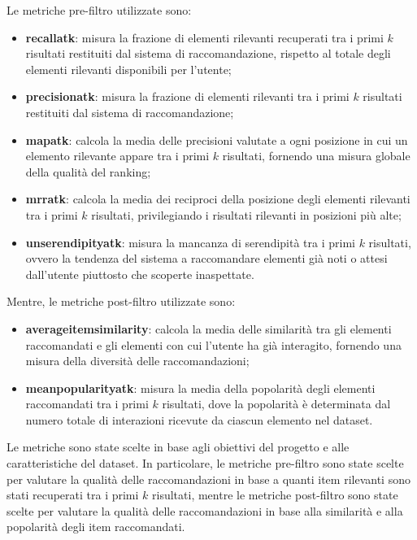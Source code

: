 Le metriche pre-filtro utilizzate sono:
\begin{itemize}
    \item \textbf{\gls{recallatk}}: misura la frazione di elementi rilevanti recuperati tra i primi $k$ risultati restituiti dal sistema di raccomandazione, rispetto al totale degli elementi rilevanti disponibili per l'utente;
    \item \textbf{\gls{precisionatk}}: misura la frazione di elementi rilevanti tra i primi $k$ risultati restituiti dal sistema di raccomandazione;
    \item \textbf{\gls{mapatk}}: calcola la media delle precisioni valutate a ogni posizione in cui un elemento rilevante appare tra i primi $k$ risultati, fornendo una misura globale della qualità del ranking;
    \item \textbf{\gls{mrratk}}: calcola la media dei reciproci della posizione degli elementi rilevanti tra i primi $k$ risultati, privilegiando i risultati rilevanti in posizioni più alte;
    \item \textbf{\gls{unserendipityatk}}: misura la mancanza di serendipità tra i primi $k$ risultati, ovvero la tendenza del sistema a raccomandare elementi già noti o attesi dall'utente piuttosto che scoperte inaspettate.
\end{itemize}

Mentre, le metriche post-filtro utilizzate sono:
\begin{itemize}
    \item \textbf{\gls{averageitemsimilarity}}: calcola la media delle similarità tra gli elementi raccomandati e gli elementi con cui l'utente ha già interagito, fornendo una misura della diversità delle raccomandazioni;
    \item \textbf{\gls{meanpopularityatk}}: misura la media della popolarità degli elementi raccomandati tra i primi $k$ risultati, dove la popolarità è determinata dal numero totale di interazioni ricevute da ciascun elemento nel dataset.
\end{itemize}

Le metriche sono state scelte in base agli obiettivi del progetto e alle caratteristiche del dataset. In particolare, le metriche pre-filtro sono state scelte per valutare la qualità delle raccomandazioni in base a quanti item rilevanti sono stati recuperati tra i primi $k$ risultati, mentre le metriche post-filtro sono state scelte per valutare la qualità delle raccomandazioni in base alla similarità e alla popolarità degli item raccomandati.

